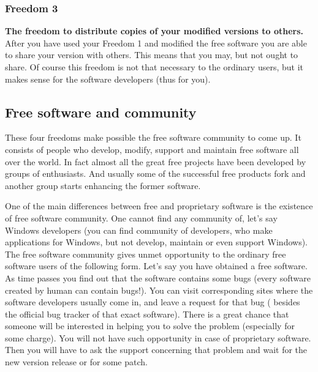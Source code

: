 \subsubsection{Freedom 3}
\textbf{The freedom to distribute copies of your modified versions to others.} After you have used your Freedom 1 and modified the free software you are able to share your version with others. This means that you may, but not ought to share. Of course this freedom is not that necessary to the ordinary users, but it makes sense for the software developers (thus for you). 


\subsection{Free software and community}

These four freedoms make possible the free software community to come up. It consists of people who develop, modify, support and maintain free software all over the world. In fact almost all the great free projects have been developed by groups of enthusiasts. And usually some of the successful free products fork and another group starts enhancing the former software.

One of the main differences between free and proprietary software is the existence of free software community. One cannot find any community of, let's say Windows developers (you can find community of developers, who make applications for Windows, but not develop, maintain or even support Windows). The free software community gives unmet opportunity to the ordinary free software users of the following form. Let's say you have obtained a free software. As time passes you find out that the software contains some bugs (every software created by human can contain bugs!). You can visit corresponding sites where the software developers usually come in, and leave a request for that bug ( besides the official bug tracker of that exact software). There is a great chance that someone will be interested in helping you to solve the problem (especially for some charge). You will not have such opportunity in case of proprietary software. Then you will have to ask the support concerning that problem and wait for the new version release or for some patch. 
